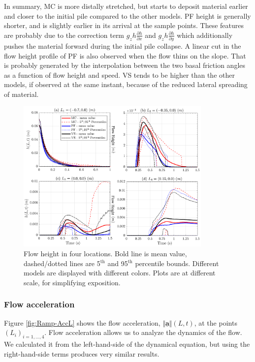 \documentclass{article}
\begin{document}
In summary, MC is more distally stretched, but starts to deposit material earlier and closer to the initial pile compared to the other models. PF height is generally shorter, and is slightly earlier in its arrival at the sample points. These features are probably due to the correction term $g_z h \frac{\partial h}{\partial x}$ and $g_z h \frac{\partial h}{\partial y}$ which additionally pushes the material forward during the initial pile collapse. A linear cut in the flow height profile of PF is also observed when the flow thins on the slope. That is probably generated by the interpolation between the two basal friction angles as a function of flow height and speed. VS tends to be higher than the other models, if observed at the same instant, because of the reduced lateral spreading of material.
\begin{figure}[H]
         \centering
        \includegraphics[width=0.85\textwidth]{figures/incline/Height.png}
        \caption{Flow height in four locations. Bold line is mean value, dashed/dotted lines are 5$^{\mathrm{th}}$ and 95$^{\mathrm{th}}$ percentile bounds. Different models are displayed with different colors. Plots are at different scale, for simplifying exposition.}
        \label{fig:Ramp-H}
\end{figure}
\subsubsection{Flow acceleration}
Figure \ref{fig:Ramp-AccL} shows the flow acceleration, $\Vert \underline{\mathbf{a}} \Vert(L,t)$, at the points $(L_i)_{i=1,\dots,4}$. Flow acceleration allows us to analyze the dynamics of the flow. We calculated it from the left-hand-side of the dynamical equation, but using the right-hand-side terms produces very similar results.
\end{document}
